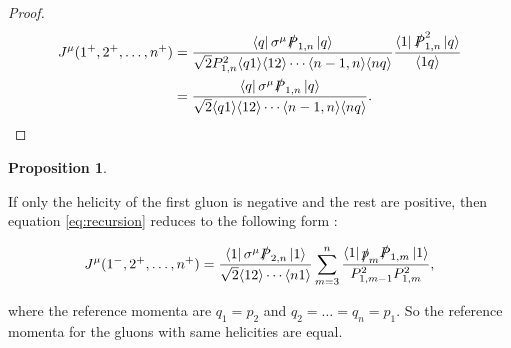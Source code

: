 \documentclass{article}
\theoremstyle{definition}
\newtheorem{prop}[theorem]{Proposition}
\numberwithin{equation}{section}
\begin{document}
\begin{proof}
    \begin{align*}
        J^{\mu}(1^{+}, 2^{+}, \dots , n^{+}) &= \frac{ \bra{q} \sigma^{\mu} \slashed{P}_{1,n} \ket{q} }{ \sqrt{2} P_{1,n}^2 \langle q1 \rangle \langle 12 \rangle \cdots \langle n-1,n \rangle \langle nq \rangle } \frac{\bra{1} \slashed{P}_{1,n}^2 \ket{q} }{\langle 1q \rangle} \\
        &= \frac{ \bra{q} \sigma^{\mu} \slashed{P}_{1,n} \ket{q} }{ \sqrt{2} \langle q1 \rangle \langle 12 \rangle \cdots \langle n-1,n \rangle \langle nq \rangle }.
    \end{align*}

\end{proof}

\begin{prop}
\label{prop:Jmppp}

    If only the helicity of the first gluon is negative and the rest are positive, then equation \eqref{eq:recursion} reduces to the following form \cite{bg88recursive}:

    \begin{align}
        J^{\mu}(1^{-}, 2^{+}, \dots , n^{+}) = \frac{ \bra{1} \sigma^{\mu} \slashed{P}_{2,n} \ket{1} }{ \sqrt{2} \langle 12 \rangle \cdots \langle n1 \rangle } \sum_{m=3}^{n} \frac{ \bra{1} \slashed{p}_m \slashed{P}_{1,m} \ket{1} }{ P_{1,m-1}^2 P_{1,m}^2 } \label{eq:Jmppp},
    \end{align}

    where the reference momenta are $q_1 = p_2$ and $q_2 = \dots = q_n = p_1$. So the reference momenta for the gluons with same helicities are equal.

\end{prop}
\end{document}
